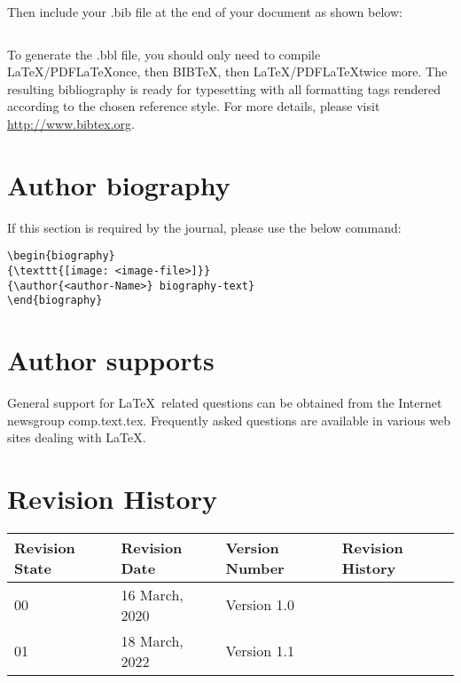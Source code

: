 \documentclass{article}
\begin{document}
Then include your .bib file at the end of your document as shown below:
\begin{verbatim}

\end{verbatim}
To generate the .bbl file, you should only need to compile \LaTeX/PDF\LaTeX once, then BIB\TeX, then \LaTeX/PDF\LaTeX twice more. The resulting bibliography is ready for typesetting with all formatting tags rendered according to the chosen reference style. For more details, please visit \url{http://www.bibtex.org}.
\section{Author biography}
If this section is required by the journal, please use the below command:
\begin{verbatim}
\begin{biography}
{\texttt{[image: <image-file>]}}
{\author{<author-Name>} biography-text}
\end{biography}
\end{verbatim}

\section{Author supports}
General support for \LaTeX\ related questions can be obtained from the Internet newsgroup comp.text.tex. Frequently asked questions are available in various web sites dealing with \LaTeX.


\section{Revision History}

\begin{tabular}{|l|l|l|l|}
\hline
Revision State & Revision Date &  Version Number & Revision History\\
\hline
 00 &    16 March, 2020 & Version 1.0   &   \\
 \hline
 01 &    18 March, 2022 & Version 1.1   &   \\
 \hline
\end{tabular}
\end{document}
